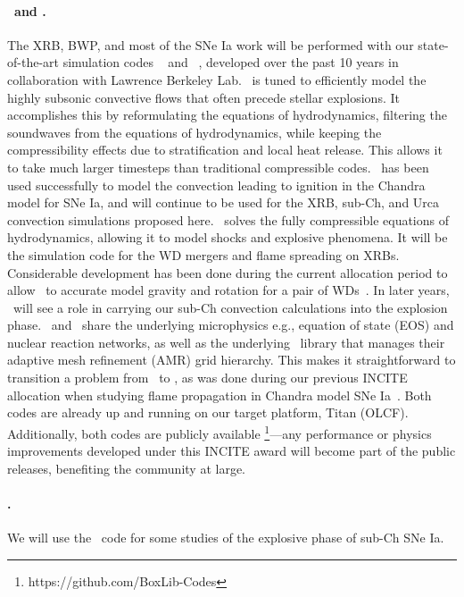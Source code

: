 \documentclass[11pt,letterpaper,english]{article}
\begin{document}
\paragraph{\maestro\ and \castro.}
%
The XRB, BWP, and most of the SNe Ia work will be performed with our
state-of-the-art simulation codes \maestro~\cite{multilevel} and
\castro~\cite{castro:I}, developed over the past 10 years in
collaboration with Lawrence Berkeley Lab.  \maestro\ is tuned to
efficiently model the highly subsonic convective flows that often
precede stellar explosions.  It accomplishes this by reformulating the
equations of hydrodynamics, filtering the soundwaves from the
equations of hydrodynamics, while keeping the compressibility effects
due to stratification and local heat release.  This allows it to take
much larger timesteps than traditional compressible codes.
\maestro\ has been used successfully to model the convection leading
to ignition in the Chandra model for SNe Ia, and will continue to be
used for the XRB, sub-Ch, and Urca convection simulations proposed
here.  \castro\ solves the fully compressible equations of
hydrodynamics, allowing it to model shocks and explosive phenomena.
It will be the simulation code for the WD mergers and flame
spreading on XRBs.  Considerable development has been done during the
current allocation period to allow \castro\ to accurate model gravity
and rotation for a pair of WDs~\cite{katz:2016}.  In later years, \castro\
will see a role in carrying our sub-Ch convection calculations into
the explosion phase.  \maestro\ and \castro\ share the underlying
microphysics e.g., equation of state (EOS) and nuclear reaction
networks, as well as the underlying \boxlib\ library that manages
their adaptive mesh refinement (AMR) grid hierarchy.  This makes it
straightforward to transition a problem from \maestro\ to \castro, as
was done during our previous INCITE allocation when studying flame
propagation in Chandra model SNe Ia~\cite{Mal14}.  Both codes are
already up and running on our target platform, Titan (OLCF).
Additionally, both codes are publicly available%
\footnote{https://github.com/BoxLib-Codes}---any performance or
physics improvements developed under this INCITE award will become
part of the public releases, benefiting the community at large.

\paragraph{\flash.}
%
We will use the \flash\ code for some studies of the explosive phase
of sub-Ch SNe Ia.  \MarginPar{Tom edit}
\end{document}
